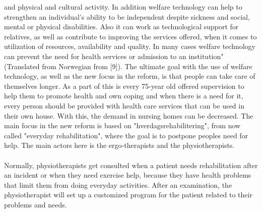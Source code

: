 and physical and cultural activity. In addition welfare technology can help to strengthen an individual's ability to be independent despite sickness and social, mental or physical disabilities. Also it can work as technological support for relatives, as well as contribute to improving the services offered, when it comes to utilization of resources, availability and quality. In many cases welfare technology can prevent the need for health services or admission to an institution" (Translated from Norwegian from [9]). The ultimate goal with the use of welfare technology, as well as the new focus in the reform, is that people can take care of themselves longer.  As a part of this is every 75-year old offered supervision to help them to promote health and own coping and when there is a need for it, every person should be provided with health care services that can be used in their own house. With this, the demand in nursing homes can be decreased. The main focus in the new reform is based on "hverdagsrehabilitering", from now called "everyday rehabilitation", where the goal is to postpone peoples need for help. The main actors here is the ergo-therapists and the physiotherapists. \\ \\
Normally, physiotherapists get consulted when a patient needs rehabilitation after an incident or when they need exercise help, because they have health problems that limit them from doing everyday activities. After an examination, the physiotherapist will set up a customized program for the patient related to their problems and needs.\\ \\
